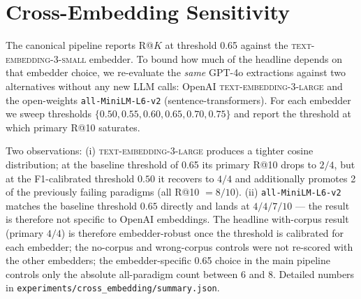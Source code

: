 \documentclass[11pt]{article}
\newcommand{\fpath}[1]{\mbox{}\nolinkurl{#1}}
\begin{document}
\section{Cross-Embedding Sensitivity}\label{app:crossemb}

The canonical pipeline reports R@$K$ at threshold 0.65 against the \textsc{text-embedding-3-small} embedder. To bound how much of the headline depends on that embedder choice, we re-evaluate the \emph{same} GPT-4o extractions against two alternatives without any new LLM calls: OpenAI \textsc{text-embedding-3-large} and the open-weights \texttt{all-MiniLM-L6-v2} (sentence-transformers). For each embedder we sweep thresholds $\{0.50, 0.55, 0.60, 0.65, 0.70, 0.75\}$ and report the threshold at which primary R@10 saturates.

\begin{table}[h]
\centering
\caption{Cross-embedding sensitivity (re-evaluation of identical GPT-4o extractions). At each embedder's calibrated threshold, primary R@10 stays at $4/4$ and all-paradigm R@10 spans $6$--$8/10$.}
\label{tab:crossemb}
\footnotesize
\setlength{\tabcolsep}{4pt}
\end{table}

Two observations:
(i) \textsc{text-embedding-3-large} produces a tighter cosine distribution; at the baseline threshold of 0.65 its primary R@10 drops to $2/4$, but at the F1-calibrated threshold $0.50$ it recovers to $4/4$ and additionally promotes 2 of the previously failing paradigms (all R@10 $= 8/10$).
(ii) \texttt{all-MiniLM-L6-v2} matches the baseline threshold $0.65$ directly and lands at $4/4 / 7/10$ --- the result is therefore not specific to OpenAI embeddings. The headline with-corpus result (primary $4/4$) is therefore embedder-robust once the threshold is calibrated for each embedder; the no-corpus and wrong-corpus controls were not re-scored with the other embedders; the embedder-specific 0.65 choice in the main pipeline controls only the absolute all-paradigm count between 6 and 8. Detailed numbers in \fpath{experiments/cross_embedding/summary.json}.
\end{document}
